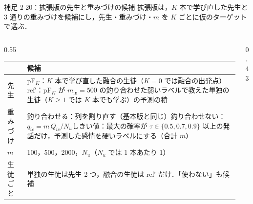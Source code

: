 \begin{frame}{補足 2-20：拡張版の先生と重みづけの候補}
  \label{s:p2:ext}
  \scriptsize
  拡張版は，$K$ 本で学び直した先生と 3 通りの重みづけを候補にし，先生・重みづけ・$m$ を $K$ ごとに仮のターゲットで選ぶ．
  \vspace{-0.3em}
  \begin{columns}[T,onlytextwidth]
    \begin{column}{0.55\textwidth}
      \setlength{\tabcolsep}{3pt}\renewcommand{\arraystretch}{0.98}
      \begin{tabular}{@{}l p{6.4cm}@{}}
        \toprule
        & 候補 \\
        \midrule
        先生 & pF$_K$：$K$ 本で学び直した融合の生徒（$K=0$ では融合の出発点）\newline ref′：pF$_K$ が $m_{\text{in}}=500$ の釣り合わせた弱いラベルで教えた単独の生徒（$K\ge1$ では $K$ 本でも学ぶ）の予測の積 \\
        重みづけ & 釣り合わせる：列を割り直す（基本版と同じ）\newline 釣り合わせない：$q_{ic} = m\,Q_{ic}/N_u$\newline しきい値：最大の確率が $\tau\in\{0.5,0.7,0.9\}$ 以上の発話だけ，予測した感情を硬いラベルにする（合計 $m$） \\
        $m$ & 100，500，2000，$N_u$（$N_u$ では 1 本あたり 1） \\
        生徒ごと & 単独の生徒は先生 2 つ，融合の生徒は ref′ だけ．「使わない」も候補 \\
        \bottomrule
      \end{tabular}\par
      \vspace{0em}
    \end{column}
    \begin{column}{0.43\textwidth}
      \centering
\end{column}
\end{columns}
\end{frame}
